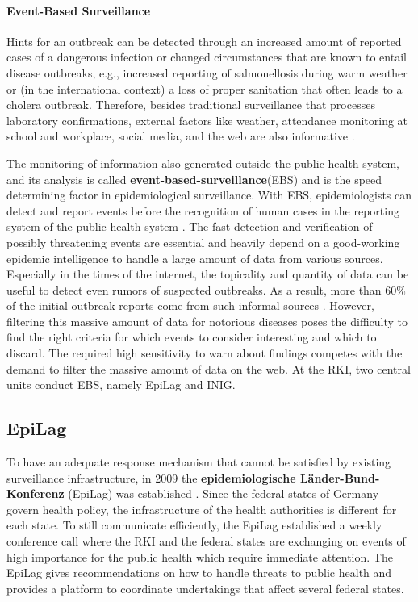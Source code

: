 \paragraph{Event-Based Surveillance}
  Hints for an outbreak can be detected through an increased amount of reported cases of a dangerous infection or changed circumstances that are known to entail disease outbreaks, e.g., increased reporting of salmonellosis during warm weather or (in the international context) a loss of proper sanitation that often leads to a cholera outbreak.
  Therefore, besides traditional surveillance that processes laboratory confirmations, external factors like weather, attendance monitoring at school and workplace, social media, and the web are also informative \citep{EarlyDetection}.

  The monitoring of information also generated outside the public health system, and its analysis is called \textbf{event-based-surveillance}(\gls{EBS}) and is the speed determining factor in epidemiological surveillance.
  With EBS, epidemiologists can detect and report events before the recognition of human cases in the reporting system of the public health system \citep{EarlyDetection}.
  The fast detection and verification of possibly threatening events are essential and heavily depend on a good-working epidemic intelligence to handle a large amount of data from various sources.
  Especially in the times of the internet, the topicality and quantity of data can be useful to detect even rumors of suspected outbreaks.
  As a result, more than 60\% of the initial outbreak reports come from such informal sources \citep{EpiSurv}.
  However, filtering this massive amount of data for notorious diseases poses the difficulty to find the right criteria for which events to consider interesting and which to discard.
  The required high sensitivity to warn about findings competes with the demand to filter the massive amount of data on the web.
  At the RKI, two central units conduct EBS, namely EpiLag and INIG.

\subsection{EpiLag}
  To have an adequate response mechanism that cannot be satisfied by existing surveillance infrastructure, in 2009 the \textbf{epidemiologische L\"ander-Bund-Konferenz} (\gls{EpiLag}) was established \citep{Mohr2010}.
  Since the federal states of Germany govern health policy, the infrastructure of the health authorities is different for each state.
  To still communicate efficiently, the EpiLag established a weekly conference call where the RKI and the federal states are exchanging on events of high importance for the public health which require immediate attention.
  The EpiLag gives recommendations on how to handle threats to public health and provides a platform to coordinate undertakings that affect several federal states.

